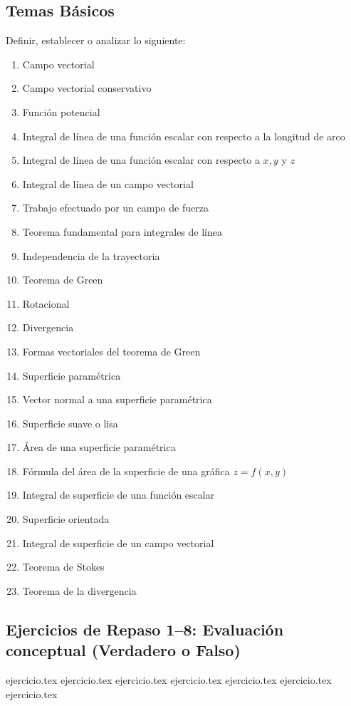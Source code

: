 
\subsection*{Temas Básicos}
Definir, establecer o analizar lo siguiente:
\begin{enumerate}
    \item Campo vectorial
    \item Campo vectorial conservativo
    \item Función potencial
    \item Integral de línea de una función escalar con respecto a la longitud de arco
    \item Integral de línea de una función escalar con respecto a $x, y$ y $z$
    \item Integral de línea de un campo vectorial
    \item Trabajo efectuado por un campo de fuerza
    \item Teorema fundamental para integrales de línea
    \item Independencia de la trayectoria
    \item Teorema de Green
    \item Rotacional
    \item Divergencia
    \item Formas vectoriales del teorema de Green
    \item Superficie paramétrica
    \item Vector normal a una superficie paramétrica
    \item Superficie suave o lisa
    \item Área de una superficie paramétrica
    \item Fórmula del área de la superficie de una gráfica $z = f(x, y)$
    \item Integral de superficie de una función escalar
    \item Superficie orientada
    \item Integral de superficie de un campo vectorial
    \item Teorema de Stokes
    \item Teorema de la divergencia
\end{enumerate}

\bigskip

\subsection*{Ejercicios de Repaso 1--8: Evaluación conceptual (Verdadero o Falso)}
\begin{enumerate}
    {ejercicio.tex}
    {ejercicio.tex}
    {ejercicio.tex}
    {ejercicio.tex}
    {ejercicio.tex}
    {ejercicio.tex}
    {ejercicio.tex}
\end{enumerate}

